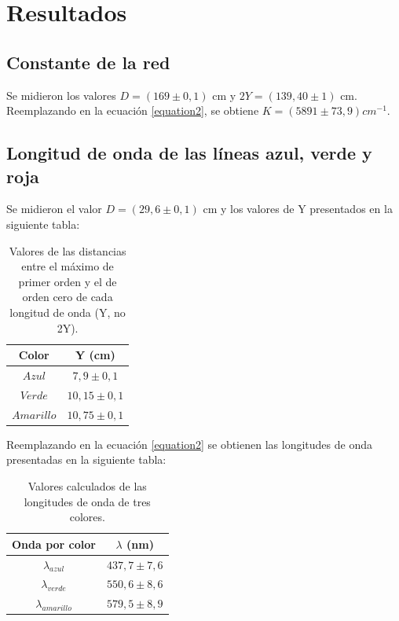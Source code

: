 \documentclass[12pt, a4paper]{article}
\begin{document}
\newpage
\section{Resultados}

\subsection{Constante de la red}
Se midieron los valores $D = (169 \pm 0,1)$ cm y $2Y = (139,40 \pm 1)$ cm. Reemplazando en la ecuación \ref{equation2},  se obtiene 
$K = (5891 \pm 73,9) cm^{-1}$.

\subsection{Longitud de onda de las líneas azul, verde y roja}
Se midieron el valor $D = (29,6 \pm 0,1)$ cm y los valores de Y presentados en la siguiente tabla:

\begin{table}[H]
  \centering
  \begin{tabular}{|c|c|}
  \hline
  Color & Y (cm) \\
  \hline
  $Azul$  & $7,9 \pm 0,1$  \\ \hline
  $Verde$  & $10,15 \pm 0,1$ \\ \hline
  $Amarillo$  & $10,75 \pm 0,1$ \\ \hline
  \end{tabular}
  \caption{\centering Valores de las distancias entre el máximo de primer orden y el de orden cero de cada longitud de onda (Y, no 2Y).}
  \label{tabla1}
\end{table}

Reemplazando en la ecuación \ref{equation2} se obtienen las longitudes de onda presentadas en la siguiente tabla:

\begin{table}[H]
  \centering
  \begin{tabular}{|c|c|}
  \hline
  Onda por color & $\lambda $ (nm)  \\
  \hline
  ${\lambda_{azul}}$  & $ 437,7 \pm 7,6$  \\ \hline
  ${\lambda_{verde}}$  & $ 550,6 \pm 8,6 $ \\ \hline
  ${\lambda_{amarillo}}$  & $ 579,5 \pm 8,9 $\\ \hline
  \end{tabular}
  \caption{\centering Valores calculados de las longitudes de onda de tres colores. }
  \label{tabla2}
\end{table}
\end{document}
